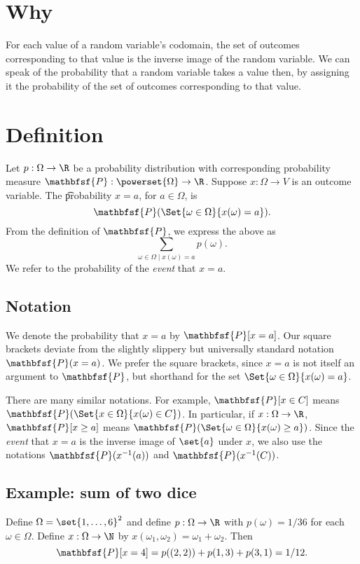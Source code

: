 

\section*{Why}

For each value of a random variable's codomain, the set of outcomes corresponding to that value is the inverse image of the random variable.
We can speak of the probability that a random variable takes a value then, by assigning it the probability of the set of outcomes corresponding to that value.

\section*{Definition}

Let $p: \Omega  \to \R $ be a probability distribution with corresponding probability measure $\mathbfsf{P} : \powerset{\Omega } \to \R $.
Suppose $x: \Omega  \to V$ is an outcome variable.
The \t{probability $x = a$}, for $a \in \Omega $, is
\[
\textstyle
\mathbfsf{P} (\Set{\omega  \in \Omega }{x(\omega ) = a}).
\]
From the definition of $\mathbfsf{P} $, we express the above as
\[
\textstyle
\sum_{\omega  \in \Omega  \mid  x(\omega ) = a} p(\omega ).
\]
We refer to the probability of the \textit{event} that $x = a$.

\subsection*{Notation}

We denote the probability that $x = a$ by $\mathbfsf{P} [x = a]$.
Our square brackets deviate from the slightly slippery but universally standard notation $\mathbfsf{P} (x = a)$.
We prefer the square brackets, since $x=a$ is not itself an argument to $\mathbfsf{P} $, but shorthand for the set $\Set{\omega  \in \Omega }{x(\omega ) = a}$.

There are many similar notations.
For example, $\mathbfsf{P} [x \in C]$ means $\mathbfsf{P} (\Set{x \in \Omega }{x(\omega ) \in C})$.
In particular, if $x: \Omega  \to \R $, $\mathbfsf{P} [x \geq a]$ means $\mathbfsf{P} (\Set{\omega  \in \Omega }{x(\omega ) \geq a})$.
Since the \textit{event} that $x = a$ is the inverse image of $\set{a}$ under $x$, we also use the notations $\mathbfsf{P} (x^{-1}(a))$ and $\mathbfsf{P} (x^{-1}(C))$.

\subsection*{Example: sum of two dice}

Define $\Omega  = \set{1, \dots , 6}^2$ and define $p: \Omega \to \R $ with $p(\omega ) = 1/36$ for each $\omega  \in \Omega $.
Define $x: \Omega  \to \N  $ by $x(\omega _1, \omega _2) = \omega _1 + \omega _2$.
Then
\[
\mathbfsf{P} [x = 4] = p((2, 2)) + p(1, 3) + p(3, 1) = 1/12.
\]
